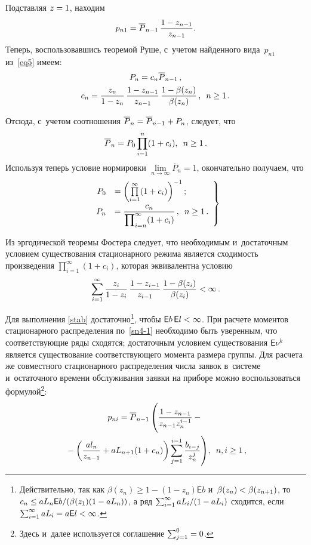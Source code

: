 \begin{multicols}{2}
\noindent  
Подставляя $z\hm=1$, находим 
$${p_{n1}\hm={\overline P}_{n-1}\,\fr{1\hm-z_{n-1}}{z_{n-1}}}.
$$
Теперь, воспользовавшись теоремой Руше, с~учетом найденного вида~$p_{n1}$ 
из~\eqref{eq5} имеем:
\begin{multline*}
P_n
=c_n {\overline P}_{n-1}\,,\\
c_n=\displaystyle\frac{\displaystyle z_{n}\mathstrut}{\displaystyle 1-z_{n}\mathstrut}\,
\displaystyle\frac{\displaystyle 1-z_{n-1}\mathstrut}{\displaystyle z_{n-1}\mathstrut}\,
\displaystyle\frac{\displaystyle 1- \beta(z_n)\mathstrut}{\displaystyle \beta(z_n)\mathstrut}\,,
\enskip n \ge 1\,.
\end{multline*}

\noindent 
Отсюда, с~учетом соотношения ${\overline P}_n\hm={\overline P}_{n-
1}\hm+P_n$, следует, что 
$${{\overline P}_{n} \hm= P_0 \prod\limits_{i=1}^n
(1+c_i)},\enskip {n \hm\ge 1}\,.
$$
Используя теперь условие нормировки
$\lim\limits_{n \rightarrow \infty } {\overline P}_n=1$,
окончательно получаем, что
\begin{equation}
\label{sn4-1}
\left.
\begin{array}{rl}
P_0 &=\left( \prod\limits_{i=1}^\infty (1+c_i) \right)^{-1};\\
P_n &= \displaystyle\frac{\displaystyle c_n\mathstrut}{\displaystyle \prod\nolimits_{i=n}^\infty
(1+c_i)\mathstrut}\,, \enskip
 n \ge 1\,.
\end{array}
\right\} 
\end{equation}

Из эргодической теоремы Фостера следует, что необходимым и~достаточным
условием существования стационарного режима является сходимость 
произведения
$\prod\nolimits_{i=1}^\infty (1+c_i)$, которая эквивалентна условию
\begin{equation}
\label{stab}
\sum\limits_{i=1}^\infty
\displaystyle\frac{\displaystyle z_{i}\mathstrut}{\displaystyle 1-z_{i}\mathstrut}\,
\displaystyle\frac{\displaystyle 1-z_{i-1}\mathstrut}{\displaystyle z_{i-1}\mathstrut}\,
\displaystyle\frac{\displaystyle 1- \beta(z_i)\mathstrut}{\displaystyle \beta(z_i)\mathstrut}
< \infty\,.
\end{equation}

\noindent 
Для выполнения \eqref{stab} достаточно\footnote{Действительно,
так как $\beta(z_n) \ge 1- (1-z_n) \mathsf{E}b$ 
и~$\beta(z_n)\hm<\beta(z_{n+1})$,
то $c_n\hm\le a L_n \mathsf{E}b/(\beta(z_1)(1\hm- a L_n))$,
а ряд $\sum\nolimits_{i=1}^\infty aL_i /(1\hm- a L_i)$
сходится, если $\sum\nolimits_{i=1}^\infty aL_i \hm= a \mathsf{E}l 
\hm<\infty$.}, чтобы $\mathsf{E}b \, \mathsf{E}l \hm< \infty$.
При расчете моментов стационарного распределения по~\eqref{sn4-1}
необходимо быть уверенным, что соответствующие ряды сходятся;
достаточным условием существования $\mathsf{E}\nu^k$
является существование соответствующего момента размера группы.
Для расчета же совместного
стационарного распределения числа заявок в~системе и~остаточного
времени обслуживания заявки на приборе можно воспользоваться
формулой\footnote{Здесь и~далее используется соглашение
$\sum\nolimits_{j=1}^0\hm=0$.}:
\begin{multline*}
p_{ni}={\overline P}_{n-1}
\left(\fr{1-z_{n-1}}{z_{n-1} z_n^{i-1}}-
\vphantom{\sum\limits_{j=1}^{i-1}} 
{}\right.\\
\left.{}-\left(
\fr{a l_n}{z_{n-1}}
+aL_{n+1} (1+c_n)
\right)
\sum\limits_{j=1}^{i-1}
\fr{b_{i-j}}{z_n^{j}}
\right)\!, \enskip n,i \ge 1\,,
\end{multline*}


\end{multicols}
